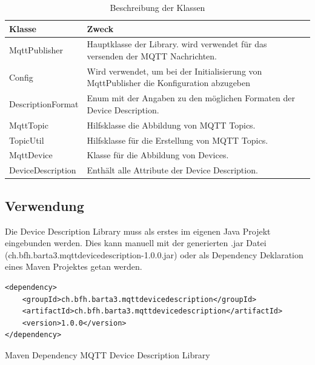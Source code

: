 \begin{table}[H]
\begin{tabularx}{\textwidth}{|l|X|}

 \hline \rowcolor{lightgray}
 {\bf Klasse } & {\bf Zweck } \\  \hline
 
 MqttPublisher & Hauptklasse der Library. wird verwendet für das versenden der MQTT Nachrichten. \\ \hline

 Config & Wird verwendet, um bei der Initialisierung von MqttPublisher die Konfiguration abzugeben \\ \hline
 
 DescriptionFormat & Enum mit der Angaben zu den möglichen Formaten der Device Description.\\ \hline
 
 MqttTopic & Hilfsklasse die Abbildung von MQTT Topics.\\ \hline
 
 TopicUtil & Hilfsklasse für die Erstellung von MQTT Topics.\\ \hline
 
 MqttDevice & Klasse für die Abbildung von Devices. \\ \hline
 
 DeviceDescription & Enthält alle Attribute der Device Description.  \\ \hline
 
\end{tabularx}
\caption{Beschreibung der Klassen}
\end{table}

\subsection{Verwendung}
Die Device Description Library muss als erstes im eigenen Java Projekt eingebunden werden. Dies kann manuell mit der generierten .jar Datei (ch.bfh.barta3.mqttdevicedescription-1.0.0.jar) oder als Dependency Deklaration eines Maven Projektes getan werden.

\begin{listing}[H]
\begin{verbatim}
<dependency>
	<groupId>ch.bfh.barta3.mqttdevicedescription</groupId>
	<artifactId>ch.bfh.barta3.mqttdevicedescription</artifactId>
	<version>1.0.0</version>
</dependency>
\end{verbatim}
\caption{Maven Dependency MQTT Device Description Library}
\end{listing}

